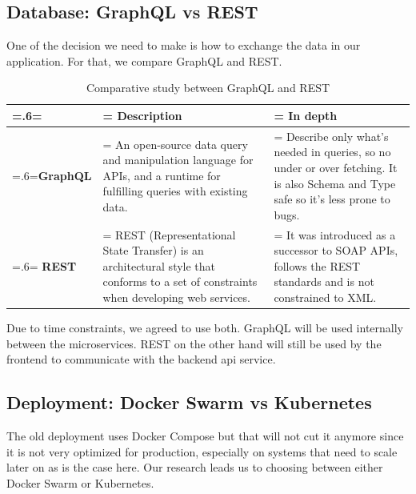 \subsection{Database: GraphQL vs REST}
One of the decision we need to make is how to exchange the data in our application.
For that, we compare GraphQL and REST.
\begin{table}[H]
    \renewcommand{\arraystretch}{1.5}%
    \caption{Comparative study between GraphQL and REST \cite{graphql-vs-rest}}
    \centering
    \medskip
    \begin{tabularx}{1\textwidth} {
            | >{\hsize=.6\hsize\linewidth=\hsize\centering\arraybackslash}X
            | >{\hsize=1.2\hsize\linewidth=\hsize\justifying\arraybackslash}X
            | >{\hsize=1.2\hsize\linewidth=\hsize\justifying\arraybackslash}X |}
        \hline
        \rowcolor{primary} & \textbf {Description}                                                                                                                          & \textbf {In depth}                                                                                                                          \\
        \hline
        \textbf{GraphQL}   & \noindent An open-source data query and manipulation language for APIs, and a runtime for fulfilling queries with existing data.               & \noindent Describe only what's needed in queries, so no under or over fetching. It is also Schema and Type safe so it's less prone to bugs. \\
        \hline\noindent
        \textbf{REST}      & \noindent REST (Representational State Transfer) is an architectural style that conforms to a set of constraints when developing web services. & \noindent It was introduced as a successor to SOAP APIs, follows the REST standards and is not constrained to XML.                          \\
        \hline
    \end{tabularx}
\end{table}
Due to time constraints, we agreed to use both.
GraphQL will be used internally between the microservices.
REST on the other hand will still be used by the frontend to communicate with the backend api service.

\subsection{Deployment: Docker Swarm vs Kubernetes}
The old deployment uses Docker Compose but that will not cut it anymore since it is not very optimized for production, especially on systems that need to scale later on as is the case here.
Our research leads us to choosing between either Docker Swarm or Kubernetes.

